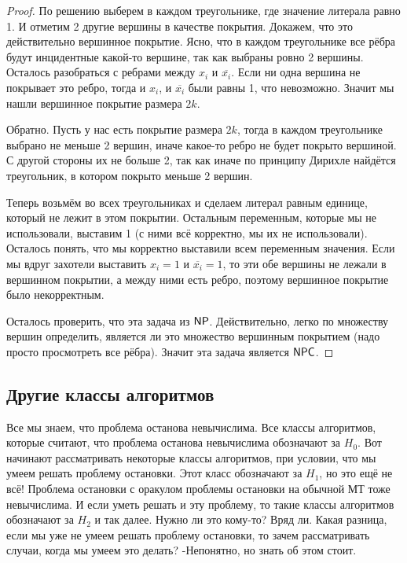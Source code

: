\documentclass[a4paper, 12pt]{article}
\begin{document}
\begin{proof}
  По решению выберем в каждом треугольнике, где значение литерала равно 1. И
  отметим 2 другие вершины в качестве покрытия. Докажем, что это действительно
  вершинное покрытие. Ясно, что в каждом треугольнике все рёбра будут
  инцидентные какой-то вершине, так как выбраны ровно 2 вершины. Осталось
  разобраться с ребрами между $x_i$ и $\overline{x_i}$.  Если ни одна
  вершина не покрывает это ребро, тогда и $x_i$, и $\overline{x_i}$ были
  равны 1, что невозможно. Значит мы нашли вершинное покрытие размера $2k$.

  Обратно. Пусть у нас есть покрытие размера $2k$, тогда в каждом треугольнике
  выбрано не меньше 2 вершин, иначе какое-то ребро не будет покрыто вершиной.
  С другой стороны их не больше 2, так как иначе по принципу Дирихле найдётся
  треугольник, в котором покрыто меньше 2 вершин.

  Теперь возьмём во всех треугольниках и сделаем литерал равным единице, который
  не лежит в этом покрытии. Остальным переменным, которые мы не использовали,
  выставим 1 (с ними всё корректно, мы их не использовали).
  Осталось понять, что мы корректно выставили всем переменным
  значения. Если мы вдруг захотели выставить $x_i = 1$ и $\overline{x_i} = 1$,
  то эти обе вершины не лежали в вершинном покрытии, а между ними есть ребро,
  поэтому вершинное покрытие было некорректным.

  Осталось проверить, что эта задача из $\mathsf{NP}$. Действительно, легко
  по множеству вершин определить, является ли это множество вершинным покрытием
  (надо просто просмотреть все рёбра). Значит эта задача является $\mathsf{NPC}$.
\end{proof}

\subsection{Другие классы алгоритмов}

Все мы знаем, что проблема останова невычислима. Все классы алгоритмов,
которые считают, что проблема останова невычислима обозначают за $H_0$. Вот
начинают рассматривать некоторые классы алгоритмов, при условии, что мы
умеем решать проблему остановки. Этот класс обозначают за $H_1$, но это ещё
не всё! Проблема остановки с оракулом проблемы остановки на обычной МТ тоже
невычислима. И если уметь решать и эту проблему, то такие классы алгоритмов
обозначают за $H_2$ и так далее. Нужно ли это кому-то? Вряд ли. Какая разница,
если мы уже не умеем решать проблему остановки, то зачем рассматривать случаи,
когда мы умеем это делать? -Непонятно, но знать об этом стоит.
\end{document}
